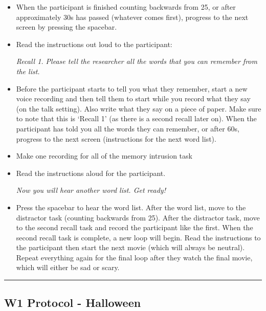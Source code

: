 \documentclass[]{book}
\begin{document}
\begin{itemize}
\item
  When the participant is finished counting backwards from 25, or after approximately 30s has passed (whatever comes first), progress to the next screen by pressing the spacebar.
\item
  Read the instructions out loud to the participant:

  \emph{Recall 1. Please tell the researcher all the words that you can remember from the list.}
\item
  Before the participant starts to tell you what they remember, start a new voice recording and then tell them to start while you record what they say (on the talk setting). Also write what they say on a piece of paper. Make sure to note that this is `Recall 1' (as there is a second recall later on). When the participant has told you all the words they can remember, or after 60s, progress to the next screen (instructions for the next word list).
\item
  Make one recording for all of the memory intrusion task
\item
  Read the instructions aloud for the participant.

  \emph{Now you will hear another word list. Get ready!}
\item
  Press the spacebar to hear the word list. After the word list, move to the distractor task (counting backwards from 25). After the distractor task, move to the second recall task and record the participant like the first. When the second recall task is complete, a new loop will begin. Read the instructions to the participant then start the next movie (which will always be neutral). Repeat everything again for the final loop after they watch the final movie, which will either be sad or scary.
\end{itemize}

\begin{center}\rule{0.5\linewidth}{0.5pt}\end{center}

\hypertarget{w1-protocol---halloween}{%
\subsection{W1 Protocol - Halloween}\label{w1-protocol---halloween}}
\end{document}
